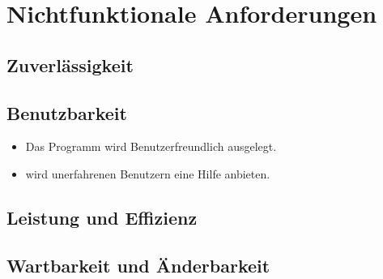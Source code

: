 \chapter{Nichtfunktionale Anforderungen}
\section{Zuverlässigkeit}
\setcounter{counterKriterien}{0}

\section{Benutzbarkeit}
\begin{itemize}
\item Das Programm wird Benutzerfreundlich ausgelegt.
\item \projektTitel wird unerfahrenen Benutzern eine Hilfe anbieten.
\end{itemize}
\section{Leistung und Effizienz}
\section{Wartbarkeit und Änderbarkeit}